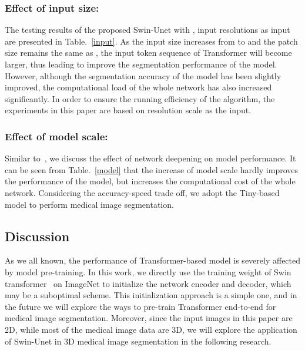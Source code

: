 \documentclass[runningheads]{llncs}
\begin{document}
\subsubsection{Effect of input size:}
The testing results of the proposed Swin-Unet with ,  input resolutions as input are presented in Table.~\ref{input}. As the input size increases from  to  and the patch size remains the same as , the input token sequence of Transformer will become larger, thus leading to improve the segmentation performance of the model. However, although the segmentation accuracy of the model has been slightly improved, the computational load of the whole network has also increased significantly. In order to ensure the running efficiency of the algorithm, the experiments in this paper are based on  resolution scale as the input.

\begin{table}[t!]
\caption{Ablation study on the impact of the model scale}\label{model}
\footnotesize
{}
\centering
\end{table}

\subsubsection{Effect of model scale:}
Similar to~\cite{swin}, we discuss the effect of network deepening on model performance. It can be seen from Table.~\ref{model} that the increase of model scale hardly improves the performance of the model, but increases the computational cost of the whole network. Considering the accuracy-speed trade off, we adopt the Tiny-based model to perform medical image segmentation.

\subsection{Discussion}

As we all known, the performance of Transformer-based model is severely affected by model pre-training. In this work, we directly use the training weight of Swin transformer~\cite{swin} on ImageNet to initialize the network encoder and decoder, which may be a suboptimal scheme. This initialization approach is a simple one, and in the future we will explore the ways to pre-train Transformer end-to-end for medical image segmentation. Moreover, since the input images in this paper are 2D, while most of the medical image data are 3D, we will explore the application of Swin-Unet in 3D medical image segmentation in the following research.
\end{document}
